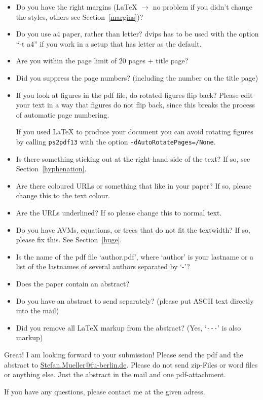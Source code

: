 \documentclass[11pt,a4paper,fleqn]{article}
\begin{document}
\begin{itemize}
\item Do you have the right margins (\LaTeX{} $\to$ no problem if you didn't change
      the styles, others see Section~\ref{margins})?
\item Do you use a4 paper, rather than letter? dvips has to be used with the option ``-t a4'' if you
  work in a setup that has letter as the default.
\item Are you within the page limit of 20 pages + title page?
\item Did you suppress the page numbers? (including the number on the title page)
\item If you look at figures in the pdf file, do rotated figures flip back?
      Please edit your text in a way that figures do not flip back, since this
      breaks the process of automatic page numbering.

If you used \LaTeX{} to produce your document you can avoid rotating figures by calling
\verb+ps2pdf13+ with the option \verb+-dAutoRotatePages=/None+.
\item Is there something sticking out at the right-hand side of the text?
      If so, see Section~\ref{hyphenation}.
\item Are there coloured URLs or something that like in your paper? If so,
      please change this to the text colour.
\item Are the URLs underlined? If so please change this to normal text.
\item Do you have AVMs, equations, or trees that do not fit the textwidth?
      If so, please fix this. See Section~\ref{huge}.
\item Is the name of the pdf file `author.pdf', where `author' is your lastname or a list of the lastnames of several authors
      separated by `-'?
\item Does the paper contain an abstract?
\item Do you have an abstract to send separately? (please put ASCII text directly into the mail)
\item Did you remove all \LaTeX{} markup from the abstract? (Yes, `\verb+---+' is also markup)
\end{itemize}
%
Great! I am looking forward to your submission!
Please send the pdf and the abstract to\newline
\href{mailto:Stefan.Mueller@fu-berlin.de}{Stefan.Mueller@fu-berlin.de}. Please do not send zip-Files
or word files or anything else. Just the abstract in the mail and one pdf-attachment.



If you have any questions, please contact me at the given adress.



\end{document}
